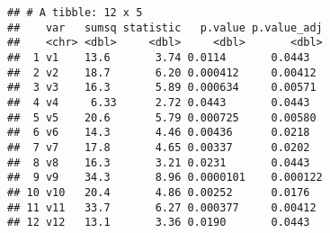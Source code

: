 \documentclass[]{article}
\newenvironment{Shaded}{\begin{snugshade}}{\end{snugshade}}
\newcommand{\KeywordTok}[1]{\textcolor[rgb]{0.13,0.29,0.53}{\textbf{#1}}}
\newcommand{\DataTypeTok}[1]{\textcolor[rgb]{0.13,0.29,0.53}{#1}}
\newcommand{\DecValTok}[1]{\textcolor[rgb]{0.00,0.00,0.81}{#1}}
\newcommand{\StringTok}[1]{\textcolor[rgb]{0.31,0.60,0.02}{#1}}
\newcommand{\OperatorTok}[1]{\textcolor[rgb]{0.81,0.36,0.00}{\textbf{#1}}}
\newcommand{\NormalTok}[1]{#1}
\begin{document}
\begin{Shaded}
\end{Shaded}

\begin{verbatim}
## # A tibble: 12 x 5
##    var   sumsq statistic   p.value p.value_adj
##    <chr> <dbl>     <dbl>     <dbl>       <dbl>
##  1 v1    13.6       3.74 0.0114       0.0443  
##  2 v2    18.7       6.20 0.000412     0.00412 
##  3 v3    16.3       5.89 0.000634     0.00571 
##  4 v4     6.33      2.72 0.0443       0.0443  
##  5 v5    20.6       5.79 0.000725     0.00580 
##  6 v6    14.3       4.46 0.00436      0.0218  
##  7 v7    17.8       4.65 0.00337      0.0202  
##  8 v8    16.3       3.21 0.0231       0.0443  
##  9 v9    34.3       8.96 0.0000101    0.000122
## 10 v10   20.4       4.86 0.00252      0.0176  
## 11 v11   33.7       6.27 0.000377     0.00412 
## 12 v12   13.1       3.36 0.0190       0.0443
\end{verbatim}
\end{document}
